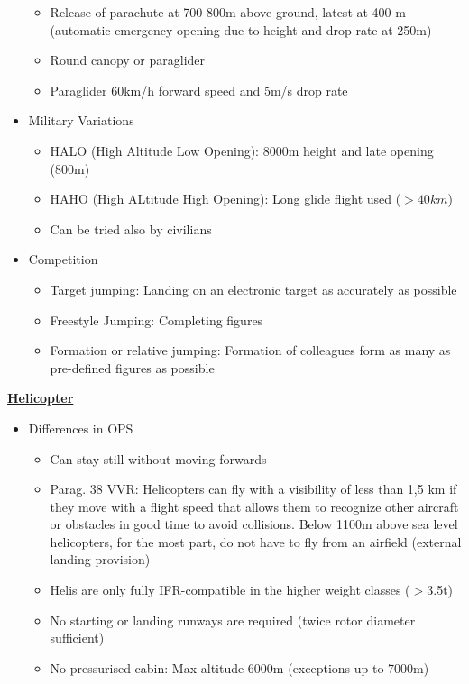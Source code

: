 \documentclass[9pt, landscape, fleqn]{scrartcl}
\begin{document}
\begin{multicols*}{3}
\begin{itemize}
\begin{itemize}
        \item Release of parachute at 700-800m above ground, latest at 400 m (automatic emergency opening due to height and drop rate at 250m)
        \item Round canopy or paraglider 
        \item Paraglider 60km/h forward speed and 5m/s drop rate 
    \end{itemize}
    \item Military Variations 
    \begin{itemize}
        \item HALO (High Altitude Low Opening): 8000m height and late opening (800m)
        \item HAHO (High ALtitude High Opening): Long glide flight used ($>40km$)
        \item Can be tried also by civilians 
    \end{itemize}
    \item Competition 
    \begin{itemize}
        \item Target jumping: Landing on an electronic target as accurately as possible 
        \item Freestyle Jumping: Completing figures
        \item Formation or relative jumping: Formation of colleagues form as many as pre-defined figures as possible
    \end{itemize}
\end{itemize}
\underline{\textbf{Helicopter}}
\begin{itemize}
    \item Differences in OPS 
    \begin{itemize}
        \item Can stay still without moving forwards 
        \item Parag. 38 VVR: Helicopters can fly with a visibility of less than 1,5 km if they move with a flight speed that allows them to recognize other aircraft or obstacles in good time to avoid collisions. Below 1100m above sea level helicopters, for the most part, do not have to fly from an airfield (external landing provision)
        \item Helis are only fully IFR-compatible in the higher weight classes ($>$3.5t)
        \item No starting or landing runways are required (twice rotor diameter sufficient)
        \item No pressurised cabin: Max altitude 6000m (exceptions up to 7000m)    

\end{itemize}
\end{itemize}
\end{multicols*}
\end{document}
